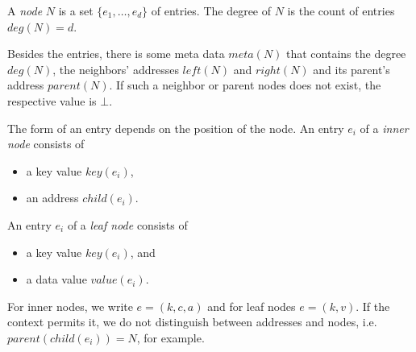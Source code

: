 \documentclass{vldb}
\begin{document}
\begin{defi}
A {\em node} $N$ is a set \mbox{$\{ e_1, \ldots, e_d \}$} of entries. 
The degree of $N$ is the count of entries \mbox{$deg(N) = d$}.

Besides the entries, there is some meta data $meta(N)$ that contains the
degree $deg(N)$, the neighbors' addresses $left(N)$ and $right(N)$ and its
parent's address $parent(N)$.
If such a neighbor or parent nodes does not exist, the respective value is
$\bot$.

The form of an entry depends on the position of the node.
An entry $e_i$ of a {\em inner node} consists of
\begin{itemize}
\item a key value $key(e_i)$,
\item an address $child(e_i)$.
\end{itemize}
An entry $e_i$ of a {\em leaf node} consists of
\begin{itemize}
\item a key value $key(e_i)$, and
\item a data value $value(e_i)$.
\end{itemize}
For inner nodes, we write \mbox{$e = (k, c, a)$} and for leaf nodes 
\mbox{$e = (k, v)$}.
If the context permits it, we do not distinguish between addresses and nodes,
i.e. \mbox{$parent(child(e_i)) = N$}, for example.
\end{defi}
\end{document}
